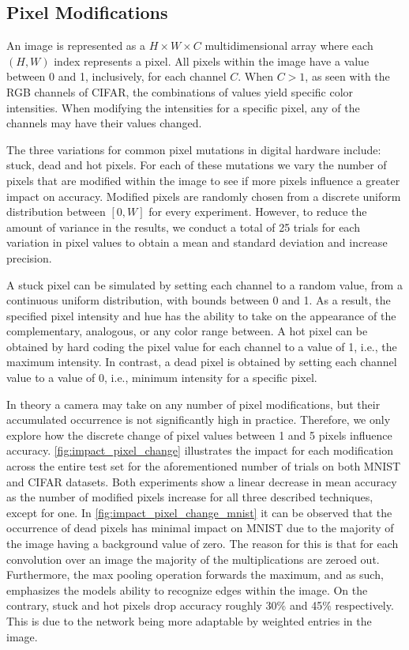 \documentclass[conference]{IEEEtran}
\begin{document}
\subsection{Pixel Modifications}

An image is represented as a $H \times W \times C $ multidimensional array where each $(H, W)$ index represents a pixel. All pixels within the image have a value between 0 and 1, inclusively, for each channel $C$. When $C > 1$, as seen with the RGB channels of CIFAR, the combinations of values yield specific color intensities. When modifying the intensities for a specific pixel, any of the channels may have their values changed.

The three variations for common pixel mutations in digital hardware include: stuck, dead and hot pixels. For each of these mutations we vary the number of pixels that are modified within the image to see if more pixels influence a greater impact on accuracy. Modified pixels are randomly chosen from a discrete uniform distribution between $[0, W]$ for every experiment. However, to reduce the amount of variance in the results, we conduct a total of 25 trials for each variation in pixel values to obtain a mean and standard deviation and increase precision. 

A stuck pixel can be simulated by setting each channel to a random value, from a continuous uniform distribution, with bounds between 0 and 1. As a result, the specified pixel intensity and hue has the ability to take on the appearance of the complementary, analogous, or any color range between. A hot pixel can be obtained by hard coding the pixel value for each channel to a value of 1, i.e., the maximum intensity. In contrast, a dead pixel is obtained by setting each channel value to a value of 0, i.e., minimum intensity for a specific pixel. 

In theory a camera may take on any number of pixel modifications, but their accumulated occurrence is not significantly high in practice. Therefore, we only explore how the discrete change of pixel values between 1 and 5 pixels influence accuracy. \autoref{fig:impact_pixel_change} illustrates the impact for each modification across the entire test set for the aforementioned number of trials on both MNIST and CIFAR datasets. Both experiments show a linear decrease in mean accuracy as the number of modified pixels increase for all three described techniques, except for one. In \autoref{fig:impact_pixel_change_mnist} it can be observed that the occurrence of dead pixels has minimal impact on MNIST due to the majority of the image having a background value of zero. The reason for this is that for each convolution over an image the majority of the multiplications are zeroed out. Furthermore, the max pooling operation forwards the maximum, and as such, emphasizes the models ability to recognize edges within the image. On the contrary, stuck and hot pixels drop accuracy roughly 30\% and 45\% respectively. This is due to the network being more adaptable by weighted entries in the image.
\end{document}
